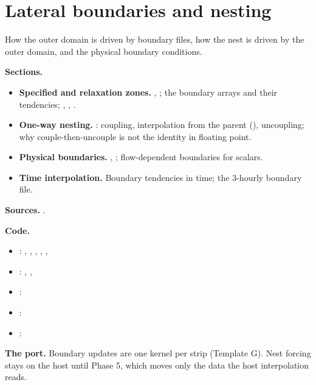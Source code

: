 \chapter{Lateral boundaries and nesting}\label{ch:bdy}

How the outer domain is driven by boundary files, how the nest is driven by the outer domain, and the physical boundary conditions.

\begin{outline}[(card B-06)]
\textbf{Sections.}
\begin{itemize}
    \item \textbf{Specified and relaxation zones.} , ; the boundary arrays and their tendencies; , , .
    \item \textbf{One-way nesting.} : coupling, interpolation from the parent (), uncoupling; why couple-then-uncouple is not the identity in floating point.
    \item \textbf{Physical boundaries.} , ; flow-dependent boundaries for scalars.
    \item \textbf{Time interpolation.} Boundary tendencies in time; the 3-hourly boundary file.
\end{itemize}
\textbf{Sources.} \citet{skamarock2019}.

\textbf{Code.}
\begin{itemize}
    \item {}: , , , , , 
    \item {}: , , 
    \item {}: 
    \item {}: 
    \item {}: 
\end{itemize}
\textbf{The port.} Boundary updates are one kernel per strip (Template G). Nest forcing stays on the host until Phase 5, which moves only the data the host interpolation reads.
\end{outline}
